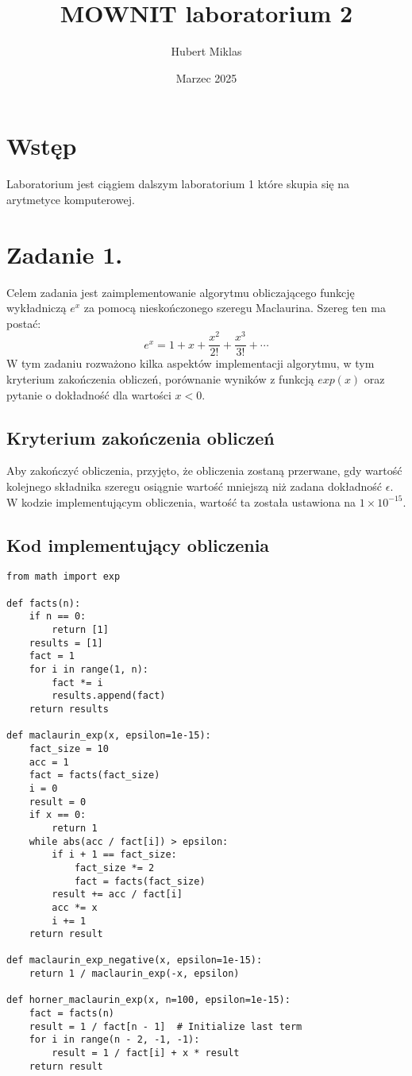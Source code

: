 \documentclass{article}
\title{MOWNIT laboratorium 2}
\author{Hubert Miklas}
\date{Marzec 2025}
\begin{document}
\maketitle



\section{Wstęp}

Laboratorium jest ciągiem dalszym laboratorium 1 które skupia się na arytmetyce komputerowej.

\section{Zadanie 1.}

Celem zadania jest zaimplementowanie algorytmu obliczającego funkcję wykładniczą $e^x$ za pomocą nieskończonego szeregu Maclaurina. Szereg ten ma postać:
\[
e^x = 1 + x + \frac{x^2}{2!} + \frac{x^3}{3!} + \cdots
\]
W tym zadaniu rozważono kilka aspektów implementacji algorytmu, w tym kryterium zakończenia obliczeń, porównanie wyników z funkcją $exp(x)$ oraz pytanie o dokładność dla wartości $x < 0$.


\subsection{Kryterium zakończenia obliczeń}

Aby zakończyć obliczenia, przyjęto, że obliczenia zostaną przerwane, gdy wartość kolejnego składnika szeregu osiągnie wartość mniejszą niż zadana dokładność $\epsilon$. W kodzie implementującym obliczenia, wartość ta została ustawiona na $1 \times 10^{-15}$.

\newpage

\subsection{Kod implementujący obliczenia}

\begin{verbatim}
from math import exp

def facts(n):
    if n == 0:
        return [1]
    results = [1]
    fact = 1
    for i in range(1, n):
        fact *= i
        results.append(fact)
    return results

def maclaurin_exp(x, epsilon=1e-15):
    fact_size = 10
    acc = 1
    fact = facts(fact_size)
    i = 0
    result = 0
    if x == 0:
        return 1
    while abs(acc / fact[i]) > epsilon:
        if i + 1 == fact_size:
            fact_size *= 2
            fact = facts(fact_size)
        result += acc / fact[i]
        acc *= x
        i += 1
    return result

def maclaurin_exp_negative(x, epsilon=1e-15):
    return 1 / maclaurin_exp(-x, epsilon)

def horner_maclaurin_exp(x, n=100, epsilon=1e-15):
    fact = facts(n)
    result = 1 / fact[n - 1]  # Initialize last term
    for i in range(n - 2, -1, -1):
        result = 1 / fact[i] + x * result
    return result

\end{verbatim}
\end{document}
